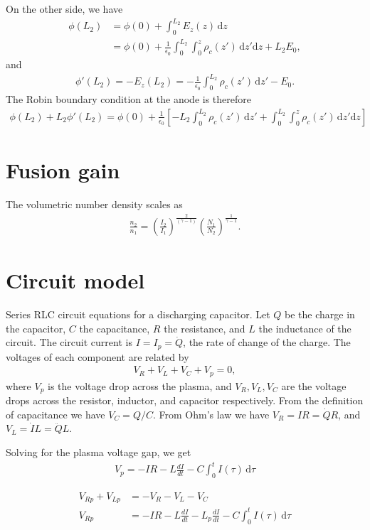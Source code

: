\documentclass{article}
\begin{document}
On the other side, we have
\begin{align*}
    \phi(L_2) &= \phi(0) + \int_0^{L_2} E_z(z) \, \mathrm{d} z \\
              &= \phi(0) + \frac{1}{\epsilon_0} \int_0^{L_2} \int_0^z \rho_c(z') \, \mathrm{d} z' \mathrm{d} z + L_2 E_0,
\end{align*}
and
\begin{align*}
    \phi'(L_2) = -E_z(L_2) = -\frac{1}{\epsilon_0} \int_0^{L_2} \rho_c(z') \, \mathrm{d} z' - E_0.
\end{align*}
The Robin boundary condition at the anode is therefore
\begin{align*}
    \phi(L_2) + L_2 \phi'(L_2) = \phi(0) + \frac{1}{\epsilon_0} \left[ -L_2 \int_0^{L_2} \rho_c(z') \, \mathrm{d} z' + \int_0^{L_2} \int_0^z \rho_c(z')\,\mathrm{d} z' \mathrm{d} z \right] 
\end{align*}

\section{Fusion gain}
The volumetric number density scales as
\begin{align*}
    \frac{n_2}{n_1} = \left( \frac{I_2}{I_1} \right)^{\frac{2}{(\gamma-1)}} \left( \frac{N_1}{N_2} \right)^{\frac{1}{\gamma-1}}.
\end{align*}

\section{Circuit model}

Series RLC circuit equations for a discharging capacitor.
Let $Q$ be the charge in the capacitor, $C$ the capacitance, $R$ the resistance,
and $L$ the inductance of the circuit.
The circuit current is $I = I_p = \dot{Q}$, the rate of change of the charge.
The voltages of each component are related by
\begin{align}
V_R + V_L + V_C + V_p = 0,
\end{align}
where $V_p$ is the voltage drop across the plasma, and $V_R, V_L, V_C$ are the voltage drops across the resistor, inductor, and capacitor respectively.
From the definition of capacitance we have $V_C = Q/C$. From Ohm's law we have $V_R = IR = \dot{Q} R$, 
and $V_L = \dot{I} L = \ddot{Q} L$.

Solving for the plasma voltage gap, we get
\begin{align*}
V_p = -IR - L \frac{dI}{dt} - C \int_0^t I(\tau) \, \mathrm{d} \tau
\end{align*}

\begin{align*}
    V_{Rp} + V_{Lp} &= -V_R - V_L - V_C \\
    V_{Rp} &= -IR - L \frac{dI}{dt} - L_p \frac{dI}{dt} - C \int_0^t I(\tau) \, \mathrm{d} \tau
\end{align*}
\end{document}
